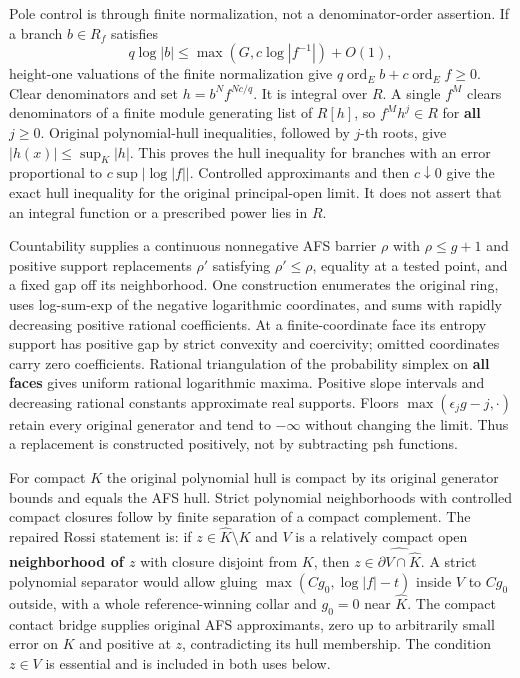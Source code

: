 \documentclass[
  10pt,
]{article}
\begin{document}
Pole control is through finite normalization, not a denominator-order
assertion. If a branch \(b\in R_f\) satisfies
\[q\log|b|\le\max(G,c\log|f^{-1}|)+O(1),\] height-one valuations of the
finite normalization give
\(q\operatorname{ord}_E b+c\operatorname{ord}_E f\ge0\). Clear
denominators and set \(h=b^N f^{Nc/q}\). It is integral over \(R\). A
single \(f^M\) clears denominators of a finite module generating list of
\(R[h]\), so \(f^Mh^j\in R\) for \textbf{all} \(j\ge0\). Original
polynomial-hull inequalities, followed by \(j\)-th roots, give
\(|h(x)|\le\sup_K|h|\). This proves the hull inequality for branches
with an error proportional to \(c\sup|\log|f||\). Controlled
approximants and then \(c\downarrow0\) give the exact hull inequality
for the original principal-open limit. It does not assert that an
integral function or a prescribed power lies in \(R\).

Countability supplies a continuous nonnegative AFS barrier \(\rho\) with
\(\rho\le g+1\) and positive support replacements \(\rho'\) satisfying
\(\rho'\le\rho\), equality at a tested point, and a fixed gap off its
neighborhood. One construction enumerates the original ring, uses
log-sum-exp of the negative logarithmic coordinates, and sums with
rapidly decreasing positive rational coefficients. At a
finite-coordinate face its entropy support has positive gap by strict
convexity and coercivity; omitted coordinates carry zero coefficients.
Rational triangulation of the probability simplex on \textbf{all faces}
gives uniform rational logarithmic maxima. Positive slope intervals and
decreasing rational constants approximate real supports. Floors
\(\max(\epsilon_jg-j,\cdot)\) retain every original generator and tend
to \(-\infty\) without changing the limit. Thus a replacement is
constructed positively, not by subtracting psh functions.

For compact \(K\) the original polynomial hull is compact by its
original generator bounds and equals the AFS hull. Strict polynomial
neighborhoods with controlled compact closures follow by finite
separation of a compact complement. The repaired Rossi statement is: if
\(z\in\widehat K\setminus K\) and \(V\) is a relatively compact open
\textbf{neighborhood of \(z\)} with closure disjoint from \(K\), then
\(z\in\widehat{\partial V\cap\widehat K}\). A strict polynomial
separator would allow gluing \(\max(Cg_0,\log|f|-t)\) inside \(V\) to
\(Cg_0\) outside, with a whole reference-winning collar and \(g_0=0\)
near \(\widehat K\). The compact contact bridge supplies original AFS
approximants, zero up to arbitrarily small error on \(K\) and positive
at \(z\), contradicting its hull membership. The condition \(z\in V\) is
essential and is included in both uses below.
\end{document}
